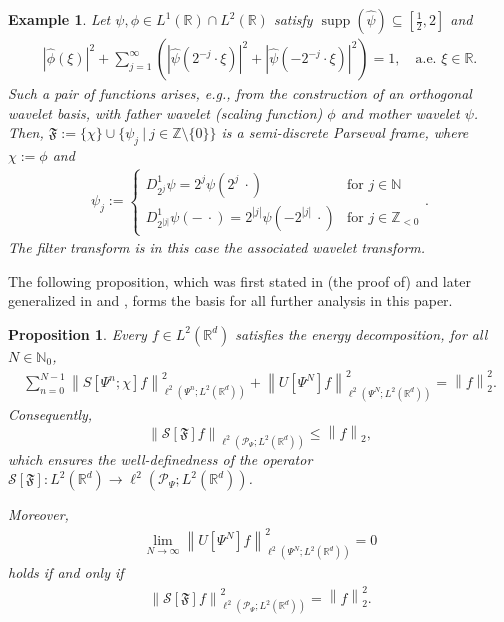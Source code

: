 \documentclass[11pt]{amsart}
\newcommand{\R}{{\mathbb{R}}}
\newcommand{\N}{\mathbb{N}}
\newcommand{\Z}{\mathbb{Z}}
\newcommand{\s}{\mathcal{S}}
\newcommand{\norm}[1]{\ensuremath{\left\lVert\text{}#1\text{}\right\rVert}}
\DeclareMathOperator{\supp}{supp}
\newtheorem{proposition}[theorem]{Proposition}
\newtheorem{example}[theorem]{Example}
\newenvironment{proof sketch} {\textit{Proof sketch.}}{}
\begin{document}
  \begin{example}\label{ex: wavelet filters in dimension 1}
    Let $\psi, \phi \in L^1(\R)\cap L^2(\R)$ satisfy $\supp(\widehat{\psi}) \subseteq [\frac{1}{2},2]$ and 
    \begin{align*}
      |\widehat{\phi}(\xi)|^2+\sum_{j=1}^\infty \left(|\widehat{\psi}(2^{-j}\cdot \xi)|^2+|\widehat{\psi}(-2^{-j}\cdot \xi)|^2\right)=1, \quad \text{a.e. } \xi \in \R.
    \end{align*}
    Such a pair of functions arises, e.g., from the construction of an orthogonal wavelet basis, with father wavelet (scaling function) $\phi$ and mother wavelet $\psi$. Then, $\mathfrak{F}:=\{\chi\}\cup \{\psi_j ~|~ j \in \Z\setminus \{0\}\}$ is a semi-discrete Parseval frame, where $\chi:=\phi$ and
    \begin{align*}
      \psi_j:=
      \begin{cases}
        D^1_{2^j}\psi=2^j \psi(2^j\:\cdot) & \text{for } j \in \N \\
        D^1_{2^{|j|}}\psi(-\:\cdot)=2^{|j|} \psi(-2^{|j|}\:\cdot) &\text{for } j \in \Z_{<0}
      \end{cases}.
    \end{align*}
    The filter transform is in this case the associated wavelet transform.
  \end{example}
  
  The following proposition, which was first stated in (the proof of) \cite[Theorem 2.6]{mallat2012group} and later generalized in \cite[Proposition 1]{wiatowski2017mathematical} and \cite[Proposition 1]{wiatowski2017energy}, forms the basis for all further analysis in this paper.
  
  \begin{proposition}\label{prop: Energy decomposition and norm-preservation of S}
    Every $f \in L^2(\R^d)$ satisfies the energy decomposition, for all $N \in \N_0$, 
    \begin{align}\label{eq: energy decomp}
      \sum_{n=0}^{N-1} \norm{S[\Psi^n;\chi]f}_{\ell^2(\Psi^n;L^2(\R^d))}^2 + \norm{U[\Psi^N]f}_{\ell^2(\Psi^N;L^2(\R^d))}^2=\norm{f}_2^2.
    \end{align}
    Consequently, 
    \[\norm{\s[\mathfrak{F}]f}_{\ell^2(\mathcal{P}_\Psi;L^2(\R^d))}\leq \norm{f}_2,\]
    which ensures the well-definedness of the operator $\s[\mathfrak{F}]: L^2(\R^d) \to \ell^2(\mathcal{P}_\Psi;L^2(\R^d))$.
  
    Moreover,
    \begin{align}\label{eq: lim W_N(f) to 0}
      \lim_{N \to \infty} \norm{U[\Psi^N]f}_{\ell^2(\Psi^N;L^2(\R^d))}^2=0
    \end{align}
    holds if and only if  
    \begin{align}\label{eq: norm-preservation of S if W_N(f) to 0}
      \norm{\s[\mathfrak{F}]f}_{\ell^2(\mathcal{P}_\Psi;L^2(\R^d))}^2= \norm{f}_2^2.
    \end{align}
  \end{proposition}
  
\end{document}
